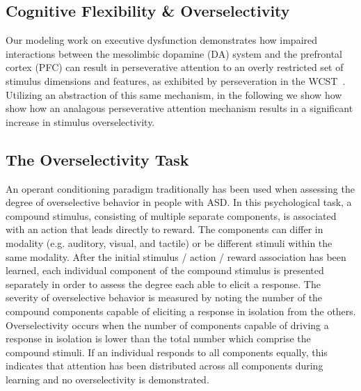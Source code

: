 \subsection{Cognitive Flexibility \& Overselectivity}
Our modeling work on executive dysfunction demonstrates how impaired interactions between the mesolimbic dopamine (DA) system and the prefrontal cortex (PFC) can result in perseverative attention to an overly restricted set of stimulus dimensions and features, as exhibited by perseveration in the WCST~\cite{KrieteT:2015:ED}.  Utilizing an abstraction of this same mechanism, in the following we show how show how an analagous perseverative attention mechanism results in a significant increase in stimulus overselectivity.   


\subsection{The Overselectivity Task}
An operant conditioning paradigm traditionally has been used when assessing the degree of overselective behavior in people with ASD.  In this psychological task, a compound stimulus, consisting of multiple separate components, is associated with an action that leads directly to reward.  The components can differ in modality (e.g. auditory, visual, and tactile) or be different stimuli within the same modality. After the initial stimulus / action / reward association has been learned, each individual component of the compound stimulus is presented separately in order to assess the degree each able to elicit a response.  The severity of overselective behavior is measured by noting the number of the compound components capable of eliciting a response in isolation from the others.  Overselectivity occurs when the number of components capable of driving a response in isolation is lower than the total number which comprise the compound stimuli.  If an individual responds to all components equally, this indicates that attention has been distributed across all components during learning and no overselectivity is demonstrated.   

